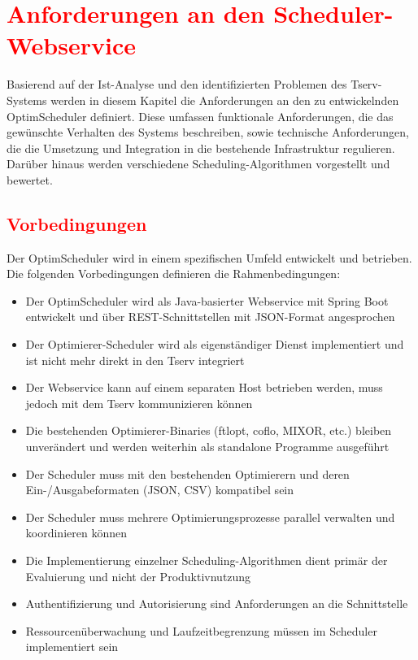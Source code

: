 \chapter{\textcolor{red}{Anforderungen an den Scheduler-Webservice}}

Basierend auf der Ist-Analyse und den identifizierten Problemen des Tserv-Systems werden in diesem Kapitel die Anforderungen an den zu entwickelnden OptimScheduler definiert. Diese umfassen funktionale Anforderungen, die das gewünschte Verhalten des Systems beschreiben, sowie technische Anforderungen, die die Umsetzung und Integration in die bestehende Infrastruktur regulieren. Darüber hinaus werden verschiedene Scheduling-Algorithmen vorgestellt und bewertet.

\section{\textcolor{red}{Vorbedingungen}}

Der OptimScheduler wird in einem spezifischen Umfeld entwickelt und betrieben. Die folgenden Vorbedingungen definieren die Rahmenbedingungen:

\begin{itemize}
    \item Der OptimScheduler wird als Java-basierter Webservice mit Spring Boot entwickelt und über REST-Schnittstellen mit JSON-Format angesprochen
    \item Der Optimierer-Scheduler wird als eigenständiger Dienst implementiert und ist nicht mehr direkt in den Tserv integriert
    \item Der Webservice kann auf einem separaten Host betrieben werden, muss jedoch mit dem Tserv kommunizieren können
    \item Die bestehenden Optimierer-Binaries (ftlopt, coflo, MIXOR, etc.) bleiben unverändert und werden weiterhin als standalone Programme ausgeführt
    \item Der Scheduler muss mit den bestehenden Optimierern und deren Ein-/Ausgabeformaten (JSON, CSV) kompatibel sein
    \item Der Scheduler muss mehrere Optimierungsprozesse parallel verwalten und koordinieren können
    \item Die Implementierung einzelner Scheduling-Algorithmen dient primär der Evaluierung und nicht der Produktivnutzung
    \item Authentifizierung und Autorisierung sind Anforderungen an die Schnittstelle
    \item Ressourcenüberwachung und Laufzeitbegrenzung müssen im Scheduler implementiert sein
\end{itemize}

